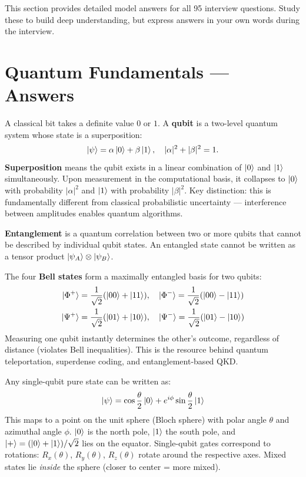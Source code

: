\documentclass[11pt,a4paper]{article}
\begin{document}
This section provides detailed model answers for all 95 interview questions. Study these to build deep understanding, but express answers in your own words during the interview.

\section{Quantum Fundamentals --- Answers}

\begin{answerbox}
A classical bit takes a definite value $0$ or $1$. A \textbf{qubit} is a two-level quantum system whose state is a superposition:
\[
\ket{\psi} = \alpha\ket{0} + \beta\ket{1}, \quad |\alpha|^2 + |\beta|^2 = 1.
\]
\textbf{Superposition} means the qubit exists in a linear combination of $\ket{0}$ and $\ket{1}$ simultaneously. Upon measurement in the computational basis, it collapses to $\ket{0}$ with probability $|\alpha|^2$ and $\ket{1}$ with probability $|\beta|^2$. Key distinction: this is fundamentally different from classical probabilistic uncertainty --- interference between amplitudes enables quantum algorithms.
\end{answerbox}

\begin{answerbox}
\textbf{Entanglement} is a quantum correlation between two or more qubits that cannot be described by individual qubit states. An entangled state cannot be written as a tensor product $\ket{\psi_A} \otimes \ket{\psi_B}$.

The four \textbf{Bell states} form a maximally entangled basis for two qubits:
\begin{align}
\ket{\Phi^+} &= \frac{1}{\sqrt{2}}(\ket{00} + \ket{11}), \quad
\ket{\Phi^-} = \frac{1}{\sqrt{2}}(\ket{00} - \ket{11}) \\
\ket{\Psi^+} &= \frac{1}{\sqrt{2}}(\ket{01} + \ket{10}), \quad
\ket{\Psi^-} = \frac{1}{\sqrt{2}}(\ket{01} - \ket{10})
\end{align}
Measuring one qubit instantly determines the other's outcome, regardless of distance (violates Bell inequalities). This is the resource behind quantum teleportation, superdense coding, and entanglement-based QKD.
\end{answerbox}

\begin{answerbox}
Any single-qubit pure state can be written as:
\[
\ket{\psi} = \cos\frac{\theta}{2}\ket{0} + e^{i\phi}\sin\frac{\theta}{2}\ket{1}
\]
This maps to a point on the unit sphere (Bloch sphere) with polar angle $\theta$ and azimuthal angle $\phi$. $\ket{0}$ is the north pole, $\ket{1}$ the south pole, and $\ket{+} = (\ket{0}+\ket{1})/\sqrt{2}$ lies on the equator. Single-qubit gates correspond to rotations: $R_x(\theta)$, $R_y(\theta)$, $R_z(\theta)$ rotate around the respective axes. Mixed states lie \emph{inside} the sphere (closer to center = more mixed).
\end{answerbox}
\end{document}
